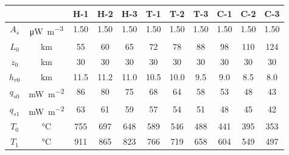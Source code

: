 \begin{tabular}{ccccccccccc}
\toprule
& & H-1 & H-2 & H-3 & T-1 & T-2 & T-3 & C-1 & C-2 & C-3 \\
\midrule
$A_{s}$ & \si{\uW\per\m\cubed} & 1.50 & 1.50 & 1.50 & 1.50 & 1.50 & 1.50 & 1.50 & 1.50 & 1.50 \\
$L_{0}$ & \si{\km} & 55 & 60 & 65 & 72 & 78 & 88 & 98 & 110 & 124 \\
$z_{0}$ & \si{\km} & 30 & 30 & 30 & 30 & 30 & 30 & 30 & 30 & 30 \\
$h_{r0}$ & \si{\km} & 11.5 & 11.2 & 11.0 & 10.5 & 10.0 & 9.5 & 9.0 & 8.5 & 8.0 \\
\midrule
$q_{s0}$ & \si{\mW\per\m\squared} & 86 & 80 & 75 & 68 & 64 & 58 & 53 & 48 & 43 \\
$q_{s1}$ & \si{\mW\per\m\squared} & 63 & 61 & 59 & 57 & 54 & 51 & 48 & 45 & 42 \\
$T_{0}$ & \si{\degreeCelsius} & 755 & 697 & 648 & 589 & 546 & 488 & 441 & 395 & 353 \\
$T_{1}$ & \si{\degreeCelsius} & 911 & 865 & 823 & 766 & 719 & 658 & 604 & 549 & 497 \\
\bottomrule
\end{tabular}
